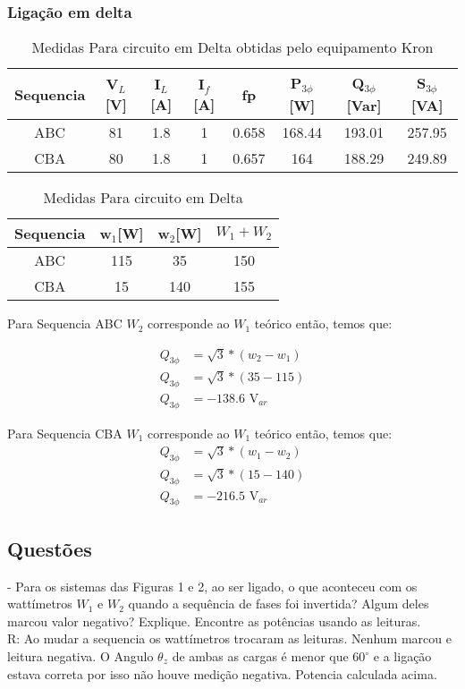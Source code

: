 \documentclass[a4paper, 12pt]{article}
\begin{document}
	\subsubsection{Ligação em delta}
	\justifying
	\begin{table}[H]
		\centering
		\begin{tabular}{|c|c|c|c|c|c|c|c|}
			\hline %
			Sequencia & V$_L$[V] & I$_L$[A] & I$_f$[A] & fp & P$_{3\phi}$[W] & Q$_{3\phi}$[Var] & S$_{3\phi}$[VA] \\
			\hline %
			ABC & 81 & 1.8 & 1 & 0.658 & 168.44 & 193.01 & 257.95     \\
			\hline %
			CBA & 80 & 1.8 & 1 & 0.657 & 164 & 188.29 & 249.89     \\
			\hline %
		\end{tabular}
		\caption{Medidas Para circuito em Delta obtidas pelo equipamento Kron}
	\end{table}
	
	\begin{table}[H]
		\centering
		\begin{tabular}{|c|c|c|c|}
			\hline %
			Sequencia & w$_1$[W] & w$_2$[W] & $W_1 + W_2$ \\
			\hline %
			ABC & 115 & 35 & 150     \\
			\hline %
			CBA & 15 & 140 & 155     \\
			\hline %
		\end{tabular}
		\caption{Medidas Para circuito em Delta}
	\end{table}
	Para Sequencia ABC $W_2$ corresponde ao $W_1$ teórico então, temos que:
	
	\[\begin{split}
		Q_{3\phi} & = \sqrt{3}\ast(w_2 - w_1) \\
		Q_{3\phi} & = \sqrt{3}\ast(35 - 115 ) \\
		Q_{3\phi} & = -138.6 \text{ V}_{ar}
	\end{split}
	\]
	
	Para Sequencia CBA $W_1$ corresponde ao $W_1$ teórico então, temos que:
	\[\begin{split}
		Q_{3\phi} & = \sqrt{3}\ast(w_1 - w_2) \\
		Q_{3\phi} & = \sqrt{3}\ast(15 - 140 ) \\
		Q_{3\phi} & = -216.5 \text{ V}_{ar}
	\end{split}
	\]
	
	\subsection{Questões}
	\justifying
	- Para os sistemas das Figuras 1 e 2, ao ser ligado, o que aconteceu com os wattímetros
	$W_1$ e $W_2$ quando a sequência de fases foi invertida? Algum deles marcou valor
	negativo? Explique. Encontre as potências usando as leituras.\\
	R: Ao mudar a sequencia os wattímetros trocaram as leituras. Nenhum marcou e leitura negativa. O Angulo $\theta _z$ de ambas as cargas é menor que $60^\circ$ e a ligação estava correta  por isso não houve medição negativa. Potencia calculada acima.
	
\end{document}
